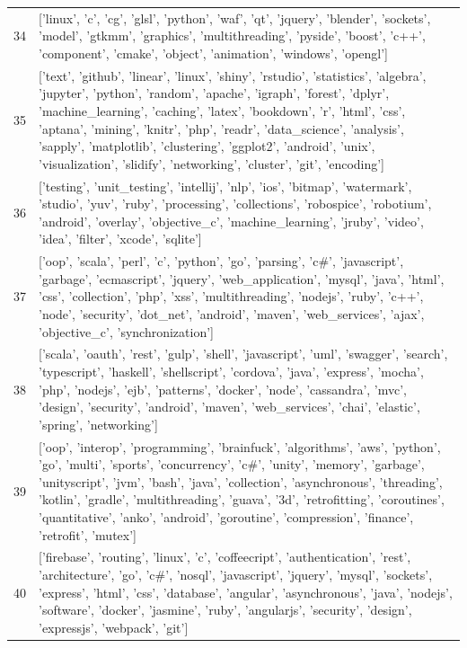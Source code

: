 \begin{center}
\begin{longtable}{|p{1.5cm}|p{12.5cm}|}
            34 & ['linux', 'c', 'cg', 'glsl', 'python', 'waf', 'qt', 'jquery', 'blender', 'sockets', 'model', 'gtkmm', 'graphics', 'multithreading', 'pyside', 'boost', 'c++', 'component', 'cmake', 'object', 'animation', 'windows', 'opengl']  \\ 
            35 & ['text', 'github', 'linear', 'linux', 'shiny', 'rstudio', 'statistics', 'algebra', 'jupyter', 'python', 'random', 'apache', 'igraph', 'forest', 'dplyr', 'machine\_learning', 'caching', 'latex', 'bookdown', 'r', 'html', 'css', 'aptana', 'mining', 'knitr', 'php', 'readr', 'data\_science', 'analysis', 'sapply', 'matplotlib', 'clustering', 'ggplot2', 'android', 'unix', 'visualization', 'slidify', 'networking', 'cluster', 'git', 'encoding']  \\ 
            36 & ['testing', 'unit\_testing', 'intellij', 'nlp', 'ios', 'bitmap', 'watermark', 'studio', 'yuv', 'ruby', 'processing', 'collections', 'robospice', 'robotium', 'android', 'overlay', 'objective\_c', 'machine\_learning', 'jruby', 'video', 'idea', 'filter', 'xcode', 'sqlite']  \\ 
            37 & ['oop', 'scala', 'perl', 'c', 'python', 'go', 'parsing', 'c\#', 'javascript', 'garbage', 'ecmascript', 'jquery', 'web\_application', 'mysql', 'java', 'html', 'css', 'collection', 'php', 'xss', 'multithreading', 'nodejs', 'ruby', 'c++', 'node', 'security', 'dot\_net', 'android', 'maven', 'web\_services', 'ajax', 'objective\_c', 'synchronization']  \\ 
            38 & ['scala', 'oauth', 'rest', 'gulp', 'shell', 'javascript', 'uml', 'swagger', 'search', 'typescript', 'haskell', 'shellscript', 'cordova', 'java', 'express', 'mocha', 'php', 'nodejs', 'ejb', 'patterns', 'docker', 'node', 'cassandra', 'mvc', 'design', 'security', 'android', 'maven', 'web\_services', 'chai', 'elastic', 'spring', 'networking']  \\ 
            39 & ['oop', 'interop', 'programming', 'brainfuck', 'algorithms', 'aws', 'python', 'go', 'multi', 'sports', 'concurrency', 'c\#', 'unity', 'memory', 'garbage', 'unityscript', 'jvm', 'bash', 'java', 'collection', 'asynchronous', 'threading', 'kotlin', 'gradle', 'multithreading', 'guava', '3d', 'retrofitting', 'coroutines', 'quantitative', 'anko', 'android', 'goroutine', 'compression', 'finance', 'retrofit', 'mutex']  \\ 
            40 & ['firebase', 'routing', 'linux', 'c', 'coffeecript', 'authentication', 'rest', 'architecture', 'go', 'c\#', 'nosql', 'javascript', 'jquery', 'mysql', 'sockets', 'express', 'html', 'css', 'database', 'angular', 'asynchronous', 'java', 'nodejs', 'software', 'docker', 'jasmine', 'ruby', 'angularjs', 'security', 'design', 'expressjs', 'webpack', 'git']  \\ 

\end{longtable}
\end{center}

